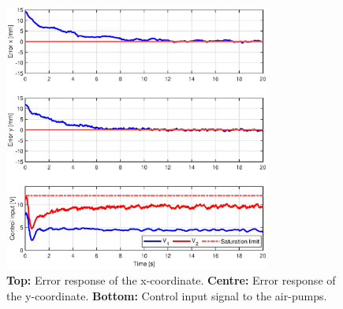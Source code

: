 \newpage
\begin{figure}[H]
    \centering
    \includegraphics[width = 0.78\textwidth]{Figures/Chapter5/errorsignalright.eps}
    \caption{\textbf{Top:} Error response of the x-coordinate. \textbf{Centre:} Error response of the y-coordinate. \textbf{Bottom:} Control input signal to the air-pumps.}
    \label{fig5:stepleft}
\end{figure}

